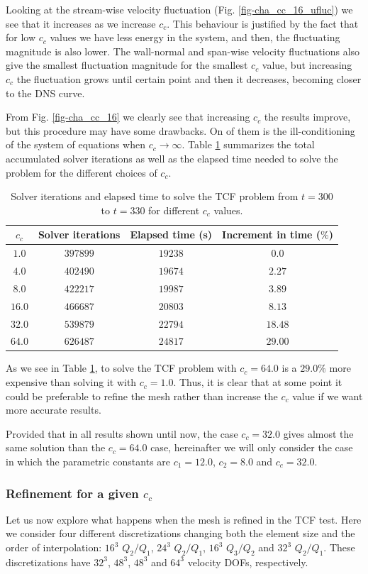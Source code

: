 Looking at the stream-wise velocity fluctuation (Fig. \ref{fig-cha_cc_16_ufluc}) we see that it increases as we increase $c_c$. This behaviour is justified by the fact that for low $c_c$ values we have less energy in the system, and then, the fluctuating magnitude is also lower. The wall-normal and span-wise velocity fluctuations also give the smallest fluctuation magnitude for the smallest $c_c$ value, but increasing $c_c$ the fluctuation grows until certain point and then it decreases, becoming closer to the DNS curve.

From Fig. \ref{fig-cha_cc_16} we clearly see that increasing $c_c$ the results improve, but this procedure may have some drawbacks. On of them is the ill-conditioning of the system of equations when $c_c\rightarrow\infty$. Table \ref{tab-cha_cc_16} summarizes the total accumulated solver iterations as well as the elapsed time needed to solve the problem for the different choices of $c_c$.
\begin{table}[h]
\caption{Solver iterations and elapsed time to solve the TCF problem from $t=300$ to $t=330$ for different $c_c$ values.}
\label{tab-cha_cc_16}
\centering
\begin{tabular}{cccc}
\toprule
$c_c$&Solver iterations&Elapsed time (s)&Increment in time ($\%$)\\
\midrule
$1.0$&$397899$&$19238$&$0.0$\\
$4.0$&$402490$&$19674$&$2.27$\\
$8.0$&$422217$&$19987$&$3.89$\\
$16.0$&$466687$&$20803$&$8.13$\\
$32.0$&$539879$&$22794$&$18.48$\\
$64.0$&$626487$&$24817$&$29.00$\\
\bottomrule
\end{tabular}
\end{table}
As we see in Table \ref{tab-cha_cc_16}, to solve the TCF problem with $c_c=64.0$ is a $29.0\%$ more expensive than solving it with $c_c=1.0$. Thus, it is clear that at some point it could be preferable to refine the mesh rather than increase the $c_c$ value if we want more accurate results. 

Provided that in all results shown until now, the case $c_c=32.0$ gives almost the same solution than the $c_c=64.0$ case, hereinafter we will only consider the case in which the parametric constants are $c_1=12.0$, $c_2=8.0$ and $c_c=32.0$.

\subsubsection{Refinement for a given $c_c$}
Let us now explore what happens when the mesh is refined in the TCF test. Here we consider four different discretizations changing both the element size and the order of interpolation: $16^3$ $Q_2/Q_1$, $24^3$ $Q_2/Q_1$, $16^3$ $Q_3/Q_2$ and $32^3$ $Q_2/Q_1$. These discretizations have $32^3$, $48^3$, $48^3$ and $64^3$ velocity DOFs, respectively.


